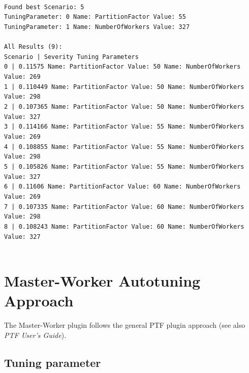 \documentclass[11pt,a4paper, oneside]{book} %
\newenvironment{code}%
{
\addtolength{\leftskip}{0.5cm}}%
{

}
\begin{document}
\begin{code}
\texttt{
\\
Found best Scenario: 5 \\
TuningParameter: 0 Name: PartitionFactor Value: 55 \\
TuningParameter: 1 Name: NumberOfWorkers Value: 327 \\
 \\
All Results (9):  \\
Scenario	|  Severity		 Tuning Parameters \\
0		|  0.11575 Name: PartitionFactor Value: 50	 Name: NumberOfWorkers Value: 269	 \\
1		|  0.110449 Name: PartitionFactor Value: 50	 Name: NumberOfWorkers Value: 298	 \\
2		|  0.107365 Name: PartitionFactor Value: 50	 Name: NumberOfWorkers Value: 327	 \\
3		|  0.114166 Name: PartitionFactor Value: 55	 Name: NumberOfWorkers Value: 269	 \\
4		|  0.108855 Name: PartitionFactor Value: 55	 Name: NumberOfWorkers Value: 298	 \\
5		|  0.105826 Name: PartitionFactor Value: 55	 Name: NumberOfWorkers Value: 327	 \\
6		|  0.11606 Name: PartitionFactor Value: 60	 Name: NumberOfWorkers Value: 269	 \\
7		|  0.107335 Name: PartitionFactor Value: 60	 Name: NumberOfWorkers Value: 298	 \\
8		|  0.108243 Name: PartitionFactor Value: 60	 Name: NumberOfWorkers Value: 327	 \\
\\
}

\end{code}



\chapter{Master-Worker Autotuning Approach}\label{sec:mappingPTF}
The Master-Worker plugin follows the general PTF plugin approach (see also \textit{PTF User's Guide}).

\section{Tuning parameter}
\end{document}
